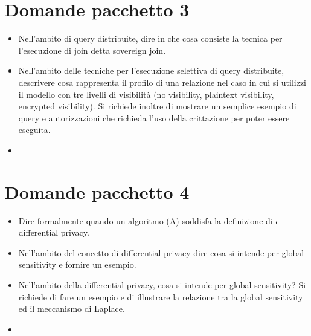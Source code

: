 \documentclass{report}
\begin{document}
\chapter{Domande pacchetto 3}
\begin{itemize}
    \item Nell'ambito di query distribuite, dire in che cosa consiste la tecnica per l'esecuzione di join detta sovereign join.
    \item Nell'ambito delle tecniche per l'esecuzione selettiva di query distribuite, descrivere cosa rappresenta il profilo
di una relazione nel caso in cui si utilizzi il modello con tre livelli di visibilità (no visibility, plaintext visibility,
encrypted visibility). Si richiede inoltre di mostrare un semplice esempio di query e autorizzazioni che richieda
l'uso della crittazione per poter essere eseguita.
    \item 
\end{itemize}

\chapter{Domande pacchetto 4}
\begin{itemize}
    \item Dire formalmente quando un algoritmo (A) soddisfa la definizione di $\epsilon$-differential privacy.
    \item Nell'ambito del concetto di differential privacy dire cosa si intende per global sensitivity e fornire un esempio.
    \item Nell'ambito della differential privacy, cosa si intende per global sensitivity? Si richiede di fare un esempio e di
illustrare la relazione tra la global sensitivity ed il meccanismo di Laplace.
    \item 
\end{itemize}
\end{document}
